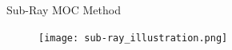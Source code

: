 
\begin{frame}[t]{Sub-Ray MOC Method}

\begin{figure}
    \centering
    \texttt{[image: sub-ray\_illustration.png]}
\end{figure}

\end{frame}